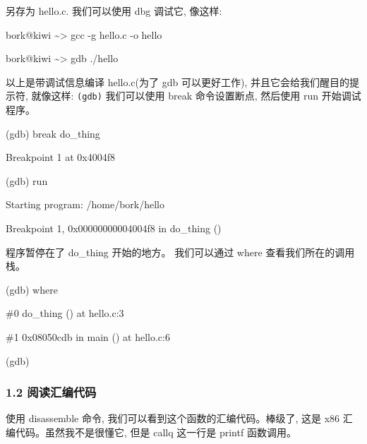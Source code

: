 \documentclass[
]{article}
\newenvironment{Shaded}{}{}
\newcommand{\NormalTok}[1]{#1}
\begin{document}
另存为 hello.c. 我们可以使用 dbg 调试它, 像这样:

\begin{Shaded}
\begin{Highlighting}[]
\NormalTok{bork@kiwi \textasciitilde{}\textgreater{} gcc {-}g hello.c {-}o hello
}
\NormalTok{bork@kiwi \textasciitilde{}\textgreater{} gdb ./hello}
\end{Highlighting}
\end{Shaded}

以上是带调试信息编译 hello.c(为了 gdb 可以更好工作),
并且它会给我们醒目的提示符, 就像这样: \texttt{(gdb)} 我们可以使用 break
命令设置断点, 然后使用 run 开始调试程序。

\begin{Shaded}
\begin{Highlighting}[]
\NormalTok{(gdb) break do\_thing 
}
\NormalTok{Breakpoint 1 at 0x4004f8
}
\NormalTok{(gdb) run
}
\NormalTok{Starting program: /home/bork/hello 
}
\NormalTok{Breakpoint 1, 0x00000000004004f8 in do\_thing ()}
\end{Highlighting}
\end{Shaded}

程序暂停在了 do\_thing 开始的地方。 我们可以通过 where
查看我们所在的调用栈。

\begin{Shaded}
\begin{Highlighting}[]
\NormalTok{(gdb) where
}
\NormalTok{\#0 do\_thing () at hello.c:3
}
\NormalTok{\#1 0x08050cdb in main () at hello.c:6
}
\NormalTok{(gdb)}
\end{Highlighting}
\end{Shaded}

\hypertarget{12-ux9605ux8bfbux6c47ux7f16ux4ee3ux7801}{%
\subsubsection{1.2
阅读汇编代码}\label{12-ux9605ux8bfbux6c47ux7f16ux4ee3ux7801}}

使用 disassemble 命令, 我们可以看到这个函数的汇编代码。棒级了, 这是 x86
汇编代码。虽然我不是很懂它, 但是 callq 这一行是 printf 函数调用。

\begin{Shaded}
\end{Shaded}
\end{document}
